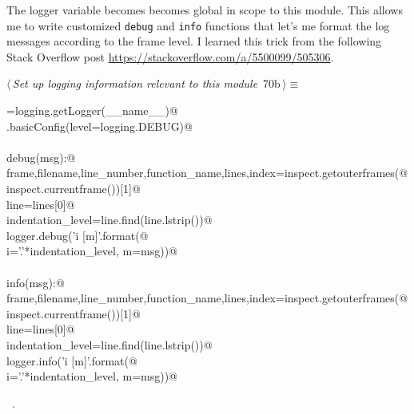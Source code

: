 \documentclass[11.5pt]{report}
\begin{document}
\vspace{-0.8cm}\newchunk The logger variable becomes becomes global in scope to this module. This allows
me to write customized \texttt{debug} and \texttt{info} functions that let's me format 
the log messages according to the frame level. I learned this trick from the following 
Stack Overflow post \url{https://stackoverflow.com/a/5500099/505306}. 
\begin{flushleft} \small
\begin{minipage}{\linewidth}\label{scrap102}\raggedright\small
{} $\langle\,${\itshape Set up logging information relevant to this module}\nobreak\ {\footnotesize {70b}}$\,\rangle\equiv$
\vspace{-1ex}
\begin{list}{}{} \item
\mbox{}\verb@logger=logging.getLogger(__name__)@\\
\mbox{}\verb@logging.basicConfig(level=logging.DEBUG)@\\
\mbox{}\verb@@\\
\mbox{}\verb@def debug(msg):@\\
\mbox{}\verb@    frame,filename,line_number,function_name,lines,index=inspect.getouterframes(@\\
\mbox{}\verb@        inspect.currentframe())[1]@\\
\mbox{}\verb@    line=lines[0]@\\
\mbox{}\verb@    indentation_level=line.find(line.lstrip())@\\
\mbox{}\verb@    logger.debug('{i} [{m}]'.format(@\\
\mbox{}\verb@        i='.'*indentation_level, m=msg))@\\
\mbox{}\verb@@\\
\mbox{}\verb@def info(msg):@\\
\mbox{}\verb@    frame,filename,line_number,function_name,lines,index=inspect.getouterframes(@\\
\mbox{}\verb@        inspect.currentframe())[1]@\\
\mbox{}\verb@    line=lines[0]@\\
\mbox{}\verb@    indentation_level=line.find(line.lstrip())@\\
\mbox{}\verb@    logger.info('{i} [{m}]'.format(@\\
\mbox{}\verb@        i='.'*indentation_level, m=msg))@\\
\mbox{}\verb@@{\NWsep}
\end{list}
\vspace{-1.5ex}
\footnotesize
\begin{list}{}{\setlength{\itemsep}{-\parsep}\setlength{\itemindent}{-\leftmargin}}
\item \NWtxtMacroRefIn\ .

\item{}
\end{list}
\end{minipage}\vspace{4ex}
\end{flushleft}
\end{document}
